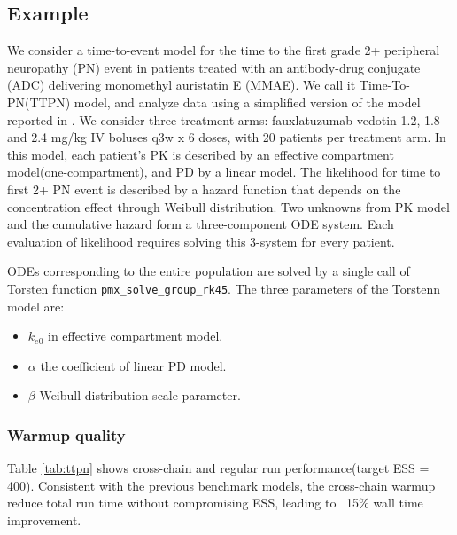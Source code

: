 \documentclass[landscape,a0paper,fontscale=0.45]{baposter} %
\begin{document}
\begin{poster}
{\begin{multicols}{2}
\subsection*{Example}
We consider a time-to-event model for the time to the first grade 2+ peripheral neuropathy (PN)
event in patients treated with an antibody-drug conjugate (ADC)
delivering monomethyl auristatin E (MMAE). We call it
Time-To-PN(TTPN) model, and analyze data using a
simplified version of the model reported in
\cite{lu_time--event_2017}. We consider three treatment arms:
fauxlatuzumab vedotin 1.2, 1.8 and 2.4 mg/kg IV boluses q3w x 6 doses,
with 20 patients per treatment arm. In this model,
each patient's PK is described by an effective compartment model(one-compartment),
and PD by a linear model. The likelihood for time to first 2+ PN event
is described by a hazard function that depends on the concentration
effect through Weibull distribution. Two unknowns from
PK model and the cumulative hazard form a three-component
ODE system. Each evaluation of likelihood requires solving this
3-system for every patient. 

ODEs corresponding to the entire
population are solved by a single call of Torsten function \texttt{\texttt{pmx\_solve\_group\_rk45}}. The three parameters of the
Torstenn model are:
\begin{itemize}
\item \(k_{e0}\) in effective compartment model.
\item \(\alpha\) the coefficient of linear PD model.
\item \(\beta\) Weibull distribution scale parameter.
\end{itemize}

\subsubsection*{Warmup quality}
Table \ref{tab:ttpn} shows cross-chain and
regular run performance(target ESS = 400). Consistent with the
previous benchmark models, the cross-chain warmup reduce total run time without
compromising ESS, leading to ~15\% wall time improvement.


\end{multicols}}
\end{poster}
\end{document}
